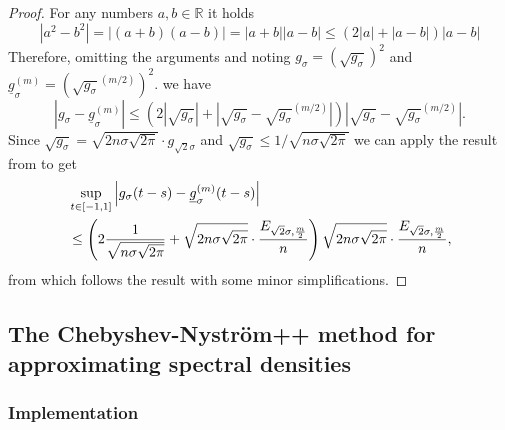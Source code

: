 \documentclass[12pt]{article}
\begin{document}
\begin{proof}
    For any numbers $a, b \in \mathbb{R}$ it holds
    \begin{equation}
    | a^2 - b^2 | = | (a + b)(a - b) | = | a + b | | a - b | \leq (2 | a | + | a - b |)  | a - b |
    \end{equation}
    Therefore, omitting the arguments and noting $g_{\sigma} = (\sqrt{g_{\sigma}})^2$ and $\underline{g}_{\sigma}^{(m)} = (\sqrt{g_{\sigma}}^{(m/2)})^2$.
    we have
    \begin{equation}
        \left| g_{\sigma} - \underline{g}_{\sigma}^{(m)} \right| \leq \left( 2 \left| \sqrt{g_{\sigma}} \right| + \left| \sqrt{g_{\sigma}} - \sqrt{g_{\sigma}}^{(m/2)} \right| \right) \left| \sqrt{g_{\sigma}} - \sqrt{g_{\sigma}}^{(m/2)} \right|.
    \end{equation}
    Since $\sqrt{g_{\sigma}} = \sqrt{2 n \sigma \sqrt{2 \pi}} \cdot g_{\sqrt{2}\sigma}$ and $\sqrt{g_{\sigma}} \leq 1/\sqrt{n \sigma \sqrt{2 \pi}}$ we can apply the result from  to get
    \begin{align}
        &\sup_{t \in [-1, 1]} \left| g_{\sigma}(t - s) - \underline{g}_{\sigma}^{(m)}(t - s) \right| \notag \\
        &\leq \left( 2 \frac{1}{\sqrt{n \sigma \sqrt{2\pi}}} + \sqrt{2 n \sigma \sqrt{2 \pi}} \cdot \frac{E_{\sqrt{2}\sigma, \frac{m}{2}}}{n}\right)\sqrt{2 n \sigma \sqrt{2 \pi}} \cdot \frac{E_{\sqrt{2}\sigma, \frac{m}{2}}}{n},
    \end{align}
    from which follows the result with some minor simplifications.
\end{proof}

\subsection{The Chebyshev-Nystr\"om++ method for approximating spectral densities}
\label{subsec:chebyshev-nystrom}

\subsubsection{Implementation}
\label{subsubsec:chebyshev-nystrom-implementation}
\end{document}
